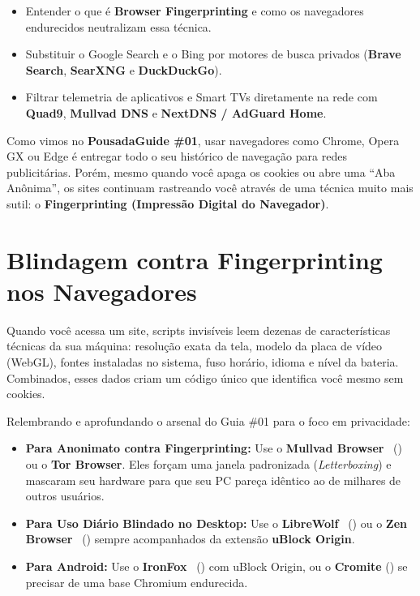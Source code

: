 \documentclass{pousadaguide}
\begin{document}
\begin{missao}
\begin{itemize}
  \item Entender o que é \textbf{Browser Fingerprinting} e como os navegadores endurecidos neutralizam essa técnica.
  \item Substituir o Google Search e o Bing por motores de busca privados (\textbf{Brave Search}, \textbf{SearXNG} e \textbf{DuckDuckGo}).
  \item Filtrar telemetria de aplicativos e Smart TVs diretamente na rede com \textbf{Quad9}, \textbf{Mullvad DNS} e \textbf{NextDNS / AdGuard Home}.
\end{itemize}
\end{missao}

Como vimos no \textbf{PousadaGuide \#01}, usar navegadores como Chrome, Opera GX ou Edge é entregar todo o seu histórico de navegação para redes publicitárias. Porém, mesmo quando você apaga os cookies ou abre uma ``Aba Anônima'', os sites continuam rastreando você através de uma técnica muito mais sutil: o \textbf{Fingerprinting (Impressão Digital do Navegador)}.

\section{Blindagem contra Fingerprinting nos Navegadores}

Quando você acessa um site, scripts invisíveis leem dezenas de características técnicas da sua máquina: resolução exata da tela, modelo da placa de vídeo (WebGL), fontes instaladas no sistema, fuso horário, idioma e nível da bateria. Combinados, esses dados criam um código único que identifica você mesmo sem cookies.

\begin{dica}
Relembrando e aprofundando o arsenal do Guia \#01 para o foco em privacidade:
\begin{itemize}
  \item \textbf{Para Anonimato contra Fingerprinting:} Use o \textbf{Mullvad Browser} \goat\ () ou o \textbf{Tor Browser}. Eles forçam uma janela padronizada (\emph{Letterboxing}) e mascaram seu hardware para que seu PC pareça idêntico ao de milhares de outros usuários.
  \item \textbf{Para Uso Diário Blindado no Desktop:} Use o \textbf{LibreWolf} \goat\ () ou o \textbf{Zen Browser} \goat\ () sempre acompanhados da extensão \textbf{uBlock Origin}.
  \item \textbf{Para Android:} Use o \textbf{IronFox} \goat\ () com uBlock Origin, ou o \textbf{Cromite} () se precisar de uma base Chromium endurecida.
\end{itemize}
\end{dica}
\end{document}
